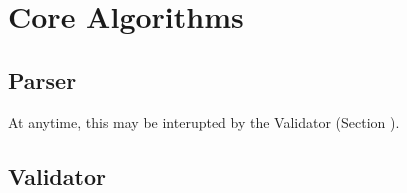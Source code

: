 

\section{Core Algorithms}

\subsection{Parser}


At anytime, this may be interupted by the Validator (Section \label{sec:validator}).

\subsection{Validator}
\label{sec:validator}


